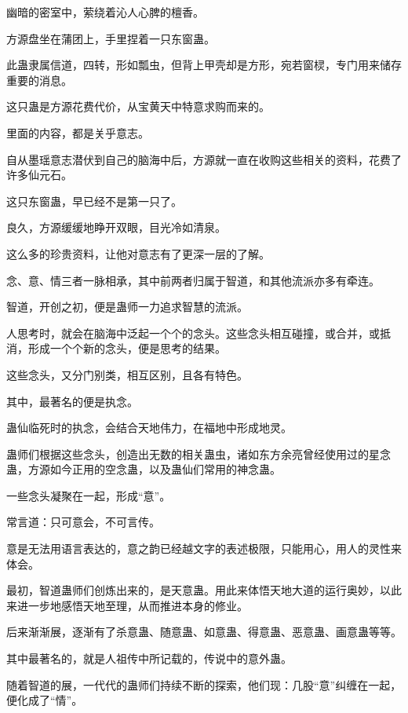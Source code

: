 
\begin{this_body}



幽暗的密室中，萦绕着沁人心脾的檀香。

方源盘坐在蒲团上，手里捏着一只东窗蛊。

此蛊隶属信道，四转，形如瓢虫，但背上甲壳却是方形，宛若窗棂，专门用来储存重要的消息。

这只蛊是方源花费代价，从宝黄天中特意求购而来的。

里面的内容，都是关乎意志。

自从墨瑶意志潜伏到自己的脑海中后，方源就一直在收购这些相关的资料，花费了许多仙元石。

这只东窗蛊，早已经不是第一只了。

良久，方源缓缓地睁开双眼，目光冷如清泉。

这么多的珍贵资料，让他对意志有了更深一层的了解。

念、意、情三者一脉相承，其中前两者归属于智道，和其他流派亦多有牵连。

智道，开创之初，便是蛊师一力追求智慧的流派。

人思考时，就会在脑海中泛起一个个的念头。这些念头相互碰撞，或合并，或抵消，形成一个个新的念头，便是思考的结果。

这些念头，又分门别类，相互区别，且各有特色。

其中，最著名的便是执念。

蛊仙临死时的执念，会结合天地伟力，在福地中形成地灵。

蛊师们根据这些念头，创造出无数的相关蛊虫，诸如东方余亮曾经使用过的星念蛊，方源如今正用的空念蛊，以及蛊仙们常用的神念蛊。

一些念头凝聚在一起，形成“意”。

常言道：只可意会，不可言传。

意是无法用语言表达的，意之韵已经越文字的表述极限，只能用心，用人的灵性来体会。

最初，智道蛊师们创炼出来的，是天意蛊。用此来体悟天地大道的运行奥妙，以此来进一步地感悟天地至理，从而推进本身的修业。

后来渐渐展，逐渐有了杀意蛊、随意蛊、如意蛊、得意蛊、恶意蛊、画意蛊等等。

其中最著名的，就是人祖传中所记载的，传说中的意外蛊。

随着智道的展，一代代的蛊师们持续不断的探索，他们现：几股“意”纠缠在一起，便化成了“情”。


\end{this_body}

